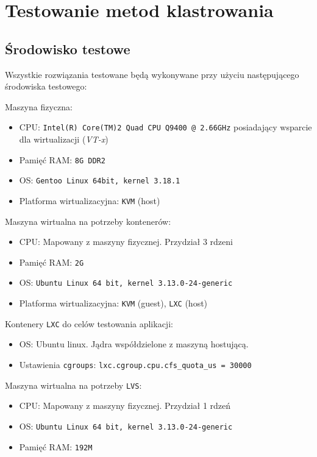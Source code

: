 \chapter{Testowanie metod klastrowania}
\section{Środowisko testowe}
Wszystkie rozwiązania testowane będą wykonywane przy użyciu następującego środowiska testowego:
\begin{description}
\item{Maszyna fizyczna:}
    \begin{itemize}
	\item CPU: \texttt{Intel(R) Core(TM)2 Quad CPU    Q9400 @ 2.66GHz} posiadający wsparcie dla wirtualizacji (\textit{VT-x})
	\item Pamięć RAM: \texttt{8G DDR2}
	\item OS: \texttt{Gentoo Linux 64bit, kernel 3.18.1}
	\item Platforma wirtualizacyjna: \texttt{KVM} (host)
    \end{itemize}
\item{Maszyna wirtualna na potrzeby kontenerów:}
    \begin{itemize}
	\item CPU: Mapowany z maszyny fizycznej. Przydział 3 rdzeni
	\item Pamięć RAM: \texttt{2G}
	\item OS: \texttt{Ubuntu Linux 64 bit, kernel 3.13.0-24-generic}
	\item Platforma wirtualizacyjna: \texttt{KVM} (guest), \texttt{LXC} (host)
    \end{itemize}
\item{Kontenery \texttt{LXC} do celów testowania aplikacji:}
    \begin{itemize}
	\item OS: Ubuntu linux. Jądra współdzielone z maszyną hostującą.
	\item Ustawienia \texttt{cgroups}: \texttt{lxc.cgroup.cpu.cfs\_quota\_us = 30000}
    \end{itemize}
\item{Maszyna wirtualna na potrzeby \texttt{LVS}:}
    \begin{itemize}
	\item CPU: Mapowany z maszyny fizycznej. Przydział 1 rdzeń
	\item OS: \texttt{Ubuntu Linux 64 bit, kernel 3.13.0-24-generic}
	\item Pamięć RAM: \texttt{192M}
    \end{itemize}
\end{description}
